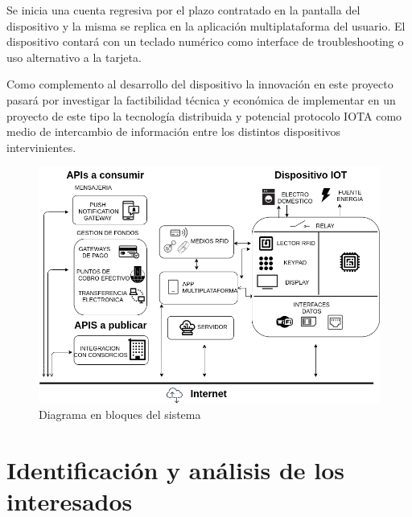 \documentclass[11pt]{charter}
\begin{document}
Se inicia una cuenta regresiva por el plazo contratado en la pantalla del dispositivo y la misma se replica en la aplicación multiplataforma del usuario. El dispositivo contará con un teclado numérico como interface de troubleshooting o uso alternativo a la tarjeta. 

Como complemento al desarrollo del dispositivo la innovación en este proyecto pasará por investigar la factibilidad técnica y económica de implementar en un proyecto de este tipo la tecnología distribuida y potencial protocolo IOTA como medio de intercambio de información entre los distintos dispositivos intervinientes.
\vspace{25px}
\begin{figure}[htpb]
\centering 
\includegraphics[width=.7\textwidth]{./Figuras/diagBloques.png}
\caption{Diagrama en bloques del sistema}
\label{fig:diagBloques}
\end{figure}
\vspace{25px}


\newpage 
\newpage 

\section{Identificación y análisis de los interesados}
\label{sec:interesados}
\end{document}
